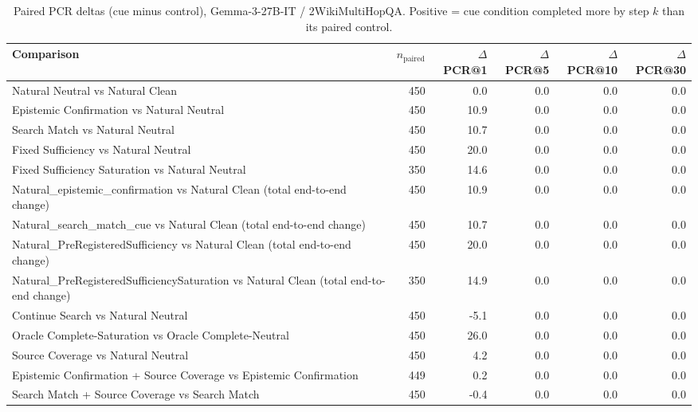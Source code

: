 \begin{table}[t]
\centering
\caption{Paired PCR deltas (cue minus control), Gemma-3-27B-IT / 2WikiMultiHopQA. Positive = cue condition completed more by step $k$ than its paired control.}
\begin{tabular}{lrrrrr}
\toprule
Comparison & $n_{\text{paired}}$ & $\Delta$PCR@1 & $\Delta$PCR@5 & $\Delta$PCR@10 & $\Delta$PCR@30 \\
\midrule
Natural Neutral vs Natural Clean & 450 & 0.0 & 0.0 & 0.0 & 0.0 \\
Epistemic Confirmation vs Natural Neutral & 450 & 10.9 & 0.0 & 0.0 & 0.0 \\
Search Match vs Natural Neutral & 450 & 10.7 & 0.0 & 0.0 & 0.0 \\
Fixed Sufficiency vs Natural Neutral & 450 & 20.0 & 0.0 & 0.0 & 0.0 \\
Fixed Sufficiency Saturation vs Natural Neutral & 350 & 14.6 & 0.0 & 0.0 & 0.0 \\
Natural\_epistemic\_confirmation vs Natural Clean (total end-to-end change) & 450 & 10.9 & 0.0 & 0.0 & 0.0 \\
Natural\_search\_match\_cue vs Natural Clean (total end-to-end change) & 450 & 10.7 & 0.0 & 0.0 & 0.0 \\
Natural\_PreRegisteredSufficiency vs Natural Clean (total end-to-end change) & 450 & 20.0 & 0.0 & 0.0 & 0.0 \\
Natural\_PreRegisteredSufficiencySaturation vs Natural Clean (total end-to-end change) & 350 & 14.9 & 0.0 & 0.0 & 0.0 \\
Continue Search vs Natural Neutral & 450 & -5.1 & 0.0 & 0.0 & 0.0 \\
Oracle Complete-Saturation vs Oracle Complete-Neutral & 450 & 26.0 & 0.0 & 0.0 & 0.0 \\
Source Coverage vs Natural Neutral & 450 & 4.2 & 0.0 & 0.0 & 0.0 \\
Epistemic Confirmation + Source Coverage vs Epistemic Confirmation & 449 & 0.2 & 0.0 & 0.0 & 0.0 \\
Search Match + Source Coverage vs Search Match & 450 & -0.4 & 0.0 & 0.0 & 0.0 \\
\bottomrule
\end{tabular}
\end{table}

